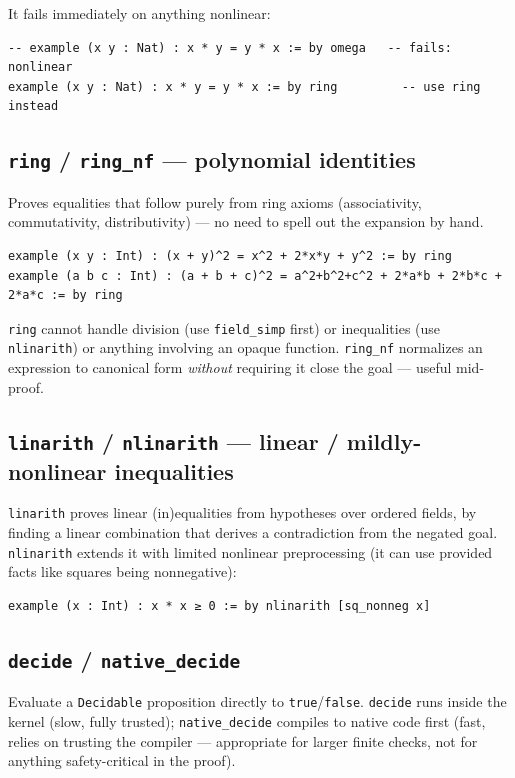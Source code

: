 It fails immediately on anything nonlinear:

\begin{verbatim}
-- example (x y : Nat) : x * y = y * x := by omega   -- fails: nonlinear
example (x y : Nat) : x * y = y * x := by ring         -- use ring instead
\end{verbatim}

\subsection{\texttt{ring} / \texttt{ring\_nf} --- polynomial identities}

Proves equalities that follow purely from ring axioms (associativity, commutativity, distributivity) --- no need to spell out the expansion by hand.

\begin{verbatim}
example (x y : Int) : (x + y)^2 = x^2 + 2*x*y + y^2 := by ring
example (a b c : Int) : (a + b + c)^2 = a^2+b^2+c^2 + 2*a*b + 2*b*c + 2*a*c := by ring
\end{verbatim}

\texttt{ring} cannot handle division (use \texttt{field\_simp} first) or inequalities (use \texttt{nlinarith}) or anything involving an opaque function. \texttt{ring\_nf} normalizes an expression to canonical form \emph{without} requiring it close the goal --- useful mid-proof.

\subsection{\texttt{linarith} / \texttt{nlinarith} --- linear / mildly-nonlinear inequalities}

\texttt{linarith} proves linear (in)equalities from hypotheses over ordered fields, by finding a linear combination that derives a contradiction from the negated goal. \texttt{nlinarith} extends it with limited nonlinear preprocessing (it can use provided facts like squares being nonnegative):

\begin{verbatim}
example (x : Int) : x * x ≥ 0 := by nlinarith [sq_nonneg x]
\end{verbatim}

\subsection{\texttt{decide} / \texttt{native\_decide}}

Evaluate a \texttt{Decidable} proposition directly to \texttt{true}/\texttt{false}. \texttt{decide} runs inside the kernel (slow, fully trusted); \texttt{native\_decide} compiles to native code first (fast, relies on trusting the compiler --- appropriate for larger finite checks, not for anything safety-critical in the proof).

